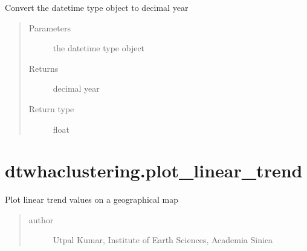 \documentclass[letterpaper,10pt,english]{sphinxmanual}
\begin{document}

\begin{fulllineitems}
\label{\detokenize{modules/analysis_support:dtwhaclustering.analysis_support.toYearFraction}}
\sphinxAtStartPar
Convert the date\sphinxhyphen{}time type object to decimal year
\begin{quote}\begin{description}
\item[{Parameters}] \leavevmode
\sphinxAtStartPar
{} \textendash{} the date\sphinxhyphen{}time type object

\item[{Returns}] \leavevmode
\sphinxAtStartPar
decimal year

\item[{Return type}] \leavevmode
\sphinxAtStartPar
float

\end{description}\end{quote}

\end{fulllineitems}



\chapter{dtwhaclustering.plot\_linear\_trend}
\label{\detokenize{modules/plot_linear_trend:module-dtwhaclustering.plot_linear_trend}}\label{\detokenize{modules/plot_linear_trend:dtwhaclustering-plot-linear-trend}}\label{\detokenize{modules/plot_linear_trend::doc}}
\sphinxAtStartPar
Plot linear trend values on a geographical map
\begin{quote}\begin{description}
\item[{author}] \leavevmode
\sphinxAtStartPar
Utpal Kumar, Institute of Earth Sciences, Academia Sinica

\end{description}\end{quote}
\end{document}
